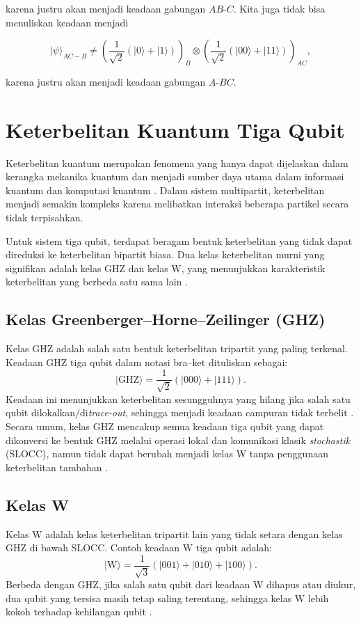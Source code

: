 karena justru akan menjadi keadaan gabungan $AB$-$C$. Kita juga tidak bisa menuliskan keadaan menjadi

\begin{equation}
|\psi\rangle_{AC-B}
\neq
\left(
\frac{1}{\sqrt{2}}
(|0\rangle + |1\rangle)
\right)_B
\otimes
\left(
\frac{1}{\sqrt{2}}
(|00\rangle + |11\rangle)
\right)_{AC} ,
\end{equation}

karena justru akan menjadi keadaan gabungan $A$-$BC$.

\section{Keterbelitan Kuantum Tiga Qubit}
Keterbelitan kuantum merupakan fenomena yang hanya dapat dijelaskan dalam kerangka mekanika kuantum dan menjadi sumber daya utama dalam informasi kuantum dan komputasi kuantum \cite{horodecki2009quantum}. Dalam sistem multipartit, keterbelitan menjadi semakin kompleks karena melibatkan interaksi beberapa partikel secara tidak terpisahkan.

Untuk sistem tiga qubit, terdapat beragam bentuk keterbelitan yang tidak dapat direduksi ke keterbelitan bipartit biasa. Dua kelas keterbelitan murni yang signifikan adalah kelas GHZ dan kelas W, yang menunjukkan karakteristik keterbelitan yang berbeda satu sama lain \cite{dur2000three}.

\subsection{Kelas Greenberger–Horne–Zeilinger (GHZ)}
Kelas GHZ adalah salah satu bentuk keterbelitan tripartit yang paling terkenal. Keadaan GHZ tiga qubit dalam notasi bra–ket dituliskan sebagai:
\begin{equation}
	|\mathrm{GHZ}\rangle = \frac{1}{\sqrt{2}}(|000\rangle + |111\rangle).
\end{equation}
Keadaan ini menunjukkan keterbelitan sesungguhnya yang hilang jika salah satu qubit dilokalkan/di\textit{trace‐out}, sehingga menjadi keadaan campuran tidak terbelit \cite{Zangi2021Robustness,Ma2007EntanglementGHZ}. Secara umum, kelas GHZ mencakup semua keadaan tiga qubit yang dapat dikonversi ke bentuk GHZ melalui operasi lokal dan komunikasi klasik \textit{stochastik} (SLOCC), namun tidak dapat berubah menjadi kelas W tanpa penggunaan keterbelitan tambahan \cite{dur2000three}.

\subsection{Kelas W}
Kelas W adalah kelas keterbelitan tripartit lain yang tidak setara dengan kelas GHZ di bawah SLOCC. Contoh keadaan W tiga qubit adalah:
\begin{equation}
	|\mathrm{W}\rangle = \frac{1}{\sqrt{3}}(|001\rangle + |010\rangle + |100\rangle).
\end{equation}
Berbeda dengan GHZ, jika salah satu qubit dari keadaan W dihapus atau diukur, dua qubit yang tersisa masih tetap saling terentang, sehingga kelas W lebih kokoh terhadap kehilangan qubit \cite{dur2000three}.

